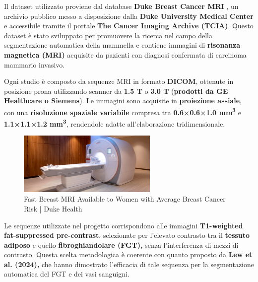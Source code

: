 

Il dataset utilizzato proviene dal database \textbf{Duke Breast Cancer MRI} \cite{duke_breast_mri}, un archivio pubblico messo a disposizione dalla \textbf{Duke University Medical Center} e accessibile tramite il portale \textbf{The Cancer Imaging Archive (TCIA)}. Questo dataset è stato sviluppato per promuovere la ricerca nel campo della segmentazione automatica della mammella e contiene immagini di \textbf{risonanza magnetica (MRI)} acquisite da pazienti con diagnosi confermata di carcinoma mammario invasivo.

Ogni studio è composto da sequenze MRI in formato \textbf{DICOM}, ottenute in posizione prona utilizzando scanner da \textbf{1.5 T} o \textbf{3.0 T} (\textbf{prodotti da GE Healthcare o Siemens}). Le immagini sono acquisite in \textbf{proiezione assiale}, con una \textbf{risoluzione spaziale variabile} compresa tra \textbf{0.6×0.6×1.0 mm\textsuperscript{3}} e \textbf{1.1×1.1×1.2 mm\textsuperscript{3}}, rendendole adatte all'elaborazione tridimensionale.

\begin{figure}
  	\centering 
 	\includegraphics[width=0.6\textwidth]{images/2025-08-09-19-34-01.png} 
    \caption{Fast Breast MRI Available to Women with Average Breast Cancer Risk | Duke Health \cite{mri_machine}}
 \end{figure} 


Le sequenze utilizzate nel progetto corrispondono alle immagini \textbf{T1-weighted} \textbf{fat-suppressed pre-contrast}, selezionate per l’elevato contrasto tra il \textbf{tessuto adiposo} e quello \textbf{fibroghiandolare (FGT),} senza l’interferenza di mezzi di contrasto. Questa scelta metodologica è coerente con quanto proposto da \textbf{Lew et al. (2024),} che hanno dimostrato l’efficacia di tale sequenza per la segmentazione automatica del FGT e dei vasi sanguigni.

